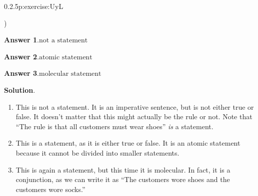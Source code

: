 \documentclass[twoside,11pt,]{book}
\newcommand{\blocktitlefont}{\relax}
\numberwithin{equation}{chapter}
\begin{document}
\begin{divisionsolution}{0.2.5}{}{p:exercise:UyL}
\begin{enumerate}[label=(\alph*)]
\begin{itemize*}[label=$\square$,leftmargin=3em,itemjoin=\hspace{1em}]
\end{itemize*})\quad
%
\end{enumerate}
%
\par\smallskip%
\noindent\textbf{\blocktitlefont Answer 1}.\quad{}\(\text{not a statement}\)%
\par\smallskip%
\noindent\textbf{\blocktitlefont Answer 2}.\quad{}\(\text{atomic statement}\)%
\par\smallskip%
\noindent\textbf{\blocktitlefont Answer 3}.\quad{}\(\text{molecular statement}\)%
\par\smallskip%
\noindent\textbf{\blocktitlefont Solution}.\quad{}%
\begin{enumerate}[label=(\alph*)]
\item{}This is not a statement. It is an imperative sentence, but is not either true or false. It doesn't matter that this might actually be the rule or not. Note that ``The rule is that all customers must wear shoes'' \emph{is} a statement.%
\item{}This is a statement, as it is either true or false. It is an atomic statement because it cannot be divided into smaller statements.%
\item{}This is again a statement, but this time it is molecular. In fact, it is a conjunction, as we can write it as ``The customers wore shoes and the customers wore socks.''%
\end{enumerate}
%
\end{divisionsolution}%
\end{document}
